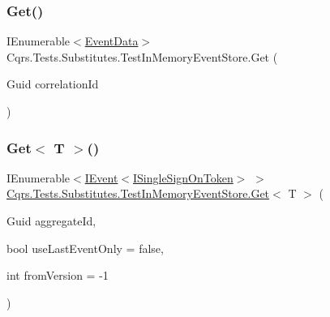 \mbox{\label{classCqrs_1_1Tests_1_1Substitutes_1_1TestInMemoryEventStore_a23098904b073af45d3a945f4a21d51e3}} 
\subsubsection{\texorpdfstring{Get()}{Get()}\hspace{0.1cm}{\footnotesize\ttfamily [2/2]}}
{\footnotesize\ttfamily I\+Enumerable$<$\hyperlink{classCqrs_1_1Events_1_1EventData}{Event\+Data}$>$ Cqrs.\+Tests.\+Substitutes.\+Test\+In\+Memory\+Event\+Store.\+Get (\begin{DoxyParamCaption}\item[{Guid}]{correlation\+Id }\end{DoxyParamCaption})}

\mbox{\label{classCqrs_1_1Tests_1_1Substitutes_1_1TestInMemoryEventStore_a6fe1ca9d8bcd3f29401457340139af11}} 
\subsubsection{\texorpdfstring{Get$<$ T $>$()}{Get< T >()}}
{\footnotesize\ttfamily I\+Enumerable$<$\hyperlink{interfaceCqrs_1_1Events_1_1IEvent}{I\+Event}$<$\hyperlink{interfaceCqrs_1_1Authentication_1_1ISingleSignOnToken}{I\+Single\+Sign\+On\+Token}$>$ $>$ \hyperlink{classCqrs_1_1Tests_1_1Substitutes_1_1TestInMemoryEventStore_a45873558fbc3bc5eb1766ffc6fbead88}{Cqrs.\+Tests.\+Substitutes.\+Test\+In\+Memory\+Event\+Store.\+Get}$<$ T $>$ (\begin{DoxyParamCaption}\item[{Guid}]{aggregate\+Id,  }\item[{bool}]{use\+Last\+Event\+Only = {\ttfamily false},  }\item[{int}]{from\+Version = {\ttfamily -\/1} }\end{DoxyParamCaption})}

